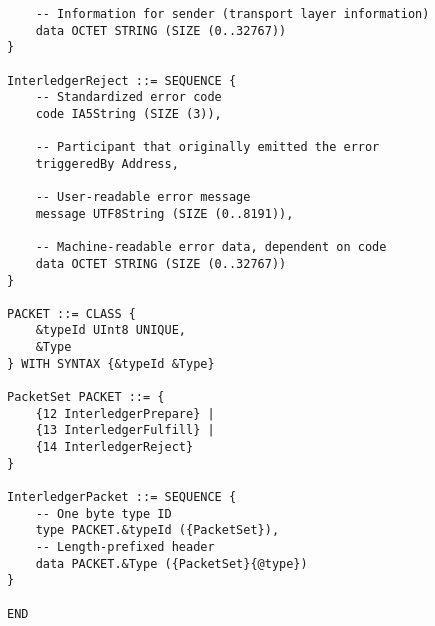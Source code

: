 \documentclass[11pt,twoside,a4paper]{article}
\begin{document}
\begin{verbatim}
    -- Information for sender (transport layer information)
    data OCTET STRING (SIZE (0..32767))
}

InterledgerReject ::= SEQUENCE {
    -- Standardized error code
    code IA5String (SIZE (3)),

    -- Participant that originally emitted the error
    triggeredBy Address,

    -- User-readable error message
    message UTF8String (SIZE (0..8191)),

    -- Machine-readable error data, dependent on code
    data OCTET STRING (SIZE (0..32767))
}

PACKET ::= CLASS {
    &typeId UInt8 UNIQUE,
    &Type
} WITH SYNTAX {&typeId &Type}

PacketSet PACKET ::= {
    {12 InterledgerPrepare} |
    {13 InterledgerFulfill} |
    {14 InterledgerReject}
}

InterledgerPacket ::= SEQUENCE {
    -- One byte type ID
    type PACKET.&typeId ({PacketSet}),
    -- Length-prefixed header
    data PACKET.&Type ({PacketSet}{@type})
}

END
\end{verbatim}
\end{document}
